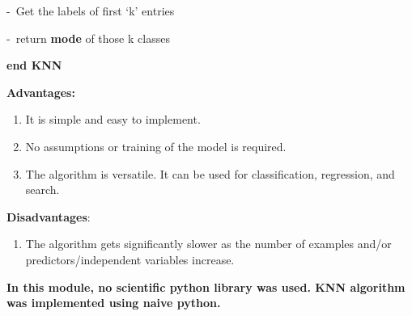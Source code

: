 \documentclass[12pt]{report}
\renewcommand{\_}{\kern-1.5pt\textunderscore\kern-1.5pt}
\begin{document}
\begin{enumerate}
\begin{FlushLeft}
\tab \tab -\  Get the labels of first ‘k’ entries
\end{FlushLeft}\par

\begin{FlushLeft}
-\  return \textbf{mode} of those k classes
\end{FlushLeft}\par

\begin{FlushLeft}
\textbf{end KNN}
\end{FlushLeft}\par

\begin{FlushLeft}
\textbf{Advantages:}
\end{FlushLeft}\par

\begin{enumerate}
	\item It is simple and easy to implement.\par

	\item No assumptions or training of the model is required.\par

	\item The algorithm is versatile. It can be used for classification, regression, and search.
\end{enumerate}\par

\begin{FlushLeft}
\textbf{Disadvantages}:
\end{FlushLeft}\par

\begin{enumerate}
	\item The algorithm gets significantly slower as the number of examples and/or predictors/independent variables increase.
\end{enumerate}\par

\begin{FlushLeft}
\textbf{In this module, no scientific python library was used. KNN algorithm was implemented using naive python.}
\end{FlushLeft}\par


\vspace{\baselineskip}


\end{enumerate}
\end{document}

